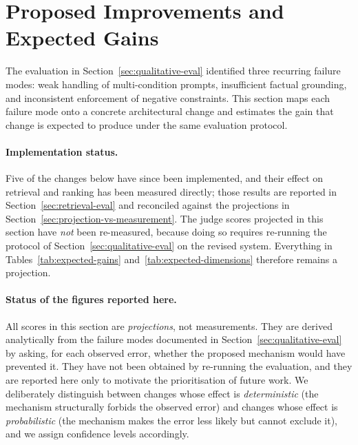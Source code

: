 %

\section{Proposed Improvements and Expected Gains}
\label{sec:expected-gains}

The evaluation in Section~\ref{sec:qualitative-eval} identified three recurring
failure modes: weak handling of multi-condition prompts, insufficient factual
grounding, and inconsistent enforcement of negative constraints. This section
maps each failure mode onto a concrete architectural change and estimates the
gain that change is expected to produce under the same evaluation protocol.

\paragraph{Implementation status.}
Five of the changes below have since been implemented, and their effect on
retrieval and ranking has been measured directly; those results are reported in
Section~\ref{sec:retrieval-eval} and reconciled against the projections in
Section~\ref{sec:projection-vs-measurement}. The judge scores projected in this
section have \emph{not} been re-measured, because doing so requires re-running
the protocol of Section~\ref{sec:qualitative-eval} on the revised system.
Everything in Tables~\ref{tab:expected-gains} and~\ref{tab:expected-dimensions}
therefore remains a projection.

\paragraph{Status of the figures reported here.}
All scores in this section are \emph{projections}, not measurements. They are
derived analytically from the failure modes documented in
Section~\ref{sec:qualitative-eval} by asking, for each observed error, whether
the proposed mechanism would have prevented it. They have not been obtained by
re-running the evaluation, and they are reported here only to motivate the
prioritisation of future work. We deliberately distinguish between changes whose
effect is \emph{deterministic} (the mechanism structurally forbids the observed
error) and changes whose effect is \emph{probabilistic} (the mechanism makes the
error less likely but cannot exclude it), and we assign confidence levels
accordingly.

